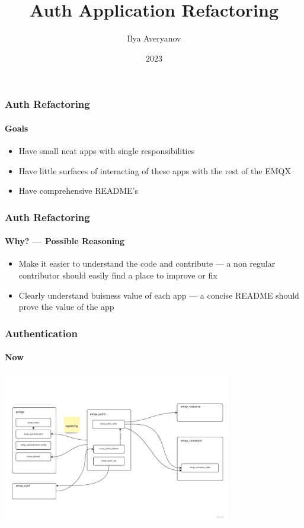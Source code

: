 \documentclass{beamer}
\title{Auth Application Refactoring}
\author{Ilya Averyanov}
\institute{EMQX}
\date{2023}
\begin{document}
\frame{\titlepage}

\begin{frame}
    \frametitle{Auth Refactoring}
    \framesubtitle{Goals}

    \begin{center}
        \begin{itemize}
            \item Have small neat apps with single responsibilities
            \item Have little surfaces of interacting of these apps with the rest of the EMQX
            \item Have comprehensive README's
        \end{itemize}
    \end{center}
\end{frame}

\begin{frame}
    \frametitle{Auth Refactoring}
    \framesubtitle{Why? — Possible Reasoning}

    \begin{center}
        \begin{itemize}
            \item Make it easier to understand the code and contribute — a non regular contributor should easily find a place to improve or fix
            \item Clearly understand buisness value of each app — a concise README should prove the value of the app
        \end{itemize}
    \end{center}
\end{frame}


\begin{frame}
    \frametitle{Authentication}
    \framesubtitle{Now}

    \begin{center}
        \includegraphics[width=10cm, keepaspectratio]{images/authn-now.jpeg}
    \end{center}
\end{frame}
\end{document}
